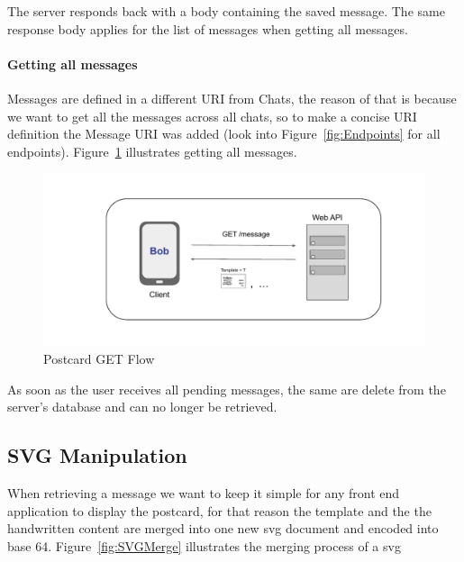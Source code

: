 \bigskip
\bigskip
\bigskip

The server responds back with a body containing the saved message.  The same response body applies for the list of messages when getting all messages.  


\paragraph{Getting all messages} Messages are defined in a different URI from Chats, the reason of that is because we want to get all the messages across all chats, so to make a concise URI definition the Message URI was added (look into Figure~\ref{fig:Endpoints} for all endpoints).
Figure~\ref{fig:PGETFlow} illustrates getting all messages.

\begin{figure}[!ht]
	\centering
	\includegraphics[width=1\textwidth]{./Chapter4/Figures/Postcard GET Flow}
	\caption{Postcard GET Flow}
	\label{fig:PGETFlow}
\end{figure}

As soon as the user receives all pending messages, the same are delete from the server's database and can no longer be retrieved. 

\bigskip
\bigskip
\bigskip


\subsection{SVG Manipulation}
\label{subsec:SVGManipulation}
When retrieving a message we want to keep it simple for any front end application to display the postcard, for that reason the template and the the handwritten content are merged into one new \gls{svg} document and encoded into base 64. Figure~\ref{fig:SVGMerge} illustrates the merging process of a \gls{svg}

